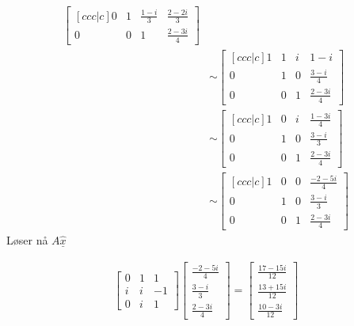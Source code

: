 \documentclass[11pt, a4paper, norsk]{NTNUoving}
\begin{document}
\begin{oppgave}
\begin{punkt}
\begin{align*}
\begin{bmatrix}[ccc|c]
                    0 & 1 & \frac{1-i}{3} & \frac{2-2i}{3} \\
                    0 & 0 & 1 & \frac{2-3i}{4}
                \end{bmatrix}
                \\
                &\sim \begin{bmatrix}[ccc|c]
                    1 & 1 & i & 1-i \\
                    0 & 1 & 0 & \frac{3-i}{4} \\
                    0 & 0 & 1 & \frac{2-3i}{4}
                \end{bmatrix}
                \\
                &\sim
                \begin{bmatrix}[ccc|c]
                    1 & 0 & i & \frac{1-3i}{4} \\
                    0 & 1 & 0 & \frac{3-i}{3} \\
                    0 & 0 & 1 & \frac{2-3i}{4}
                \end{bmatrix}
                \\
                &\sim \begin{bmatrix}[ccc|c]
                    1 & 0 & 0 & \frac{-2-5i}{4} \\
                    0 & 1 & 0 & \frac{3-i}{3} \\
                    0 & 0 & 1 & \frac{2-3i}{4}
                \end{bmatrix}
            \end{align*}
            Løser nå $A\underline{\hat{x}}$

            \begin{align*}
                \begin{bmatrix}
                    0 & 1 & 1 \\
                    i & i & -1 \\
                    0 & i & 1
                \end{bmatrix}\begin{bmatrix}
                \frac{-2-5i}{4} \\
                \frac{3-i}{3} \\
                \frac{2-3i}{4}
                \end{bmatrix} = \begin{bmatrix}
                \frac{17-15i}{12} \\
                \frac{13+15i}{12} \\
                \frac{10-3i}{12}
                \end{bmatrix}
            \end{align*}
        \end{punkt}
   \end{oppgave} 
    
\end{document}
